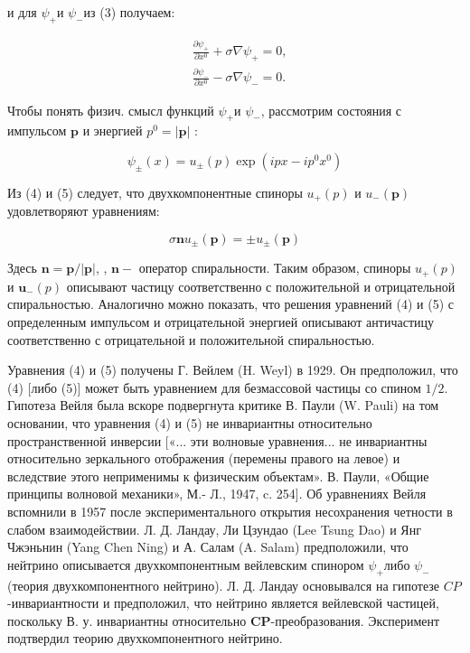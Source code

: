 \documentclass[10pt]{article}
\begin{document}
и для $\psi_{+}$и $\psi_{-}$из (3) получаем:



\[

\begin{aligned}

& \frac{\partial \psi_{+}}{\partial x^{0}}+\sigma \nabla \psi_{+}=0, \\

& \frac{\partial \psi_{-}}{\partial x^{0}}-\sigma \nabla \psi_{-}=0 .

\end{aligned}

\]



Чтобы понять физич. смысл функций $\psi_{+}$и $\psi_{-}$, рассмотрим состояния с импульсом $\boldsymbol{p}$ и энергией $p^{0}=|\boldsymbol{p}|$ :



\[

\psi_{ \pm}(x)=u_{ \pm}(p) \exp \left(i p x-i p^{0} x^{0}\right)

\]



Из (4) и (5) следует, что двухкомпонентные спиноры $u_{+}(p)$ и $u_{-}(\boldsymbol{p})$ удовлетворяют уравнениям:



\[

\sigma \boldsymbol{n} u_{ \pm}(\boldsymbol{p})= \pm u_{ \pm}(\boldsymbol{p})

\]



Здесь $\boldsymbol{n}=\boldsymbol{p} /|\boldsymbol{p}|$, , $\boldsymbol{n}-$ оператор спиральности. Таким образом, спиноры $u_{+}(p)$ и $\boldsymbol{u}_{-}(p)$ описывают частицу соответственно с положительной и отрицательной спиральностью. Аналогично можно показать, что решения уравнений (4) и (5) с определенным импульсом и отрицательной энергией описывают античастицу соответственно с отрицательной и положительной спиральностью.



Уравнения (4) и (5) получены Г. Вейлем (H. Weyl) в 1929. Он предположил, что (4) [либо (5)] может быть уравнением для безмассовой частицы со спином $1 / 2$. Гипотеза Вейля была вскоре подвергнута критике В. Паули (W. Pauli) на том основании, что уравнения (4) и (5) не инвариантны относительно пространственной инверсии [«... эти волновые уравнения... не инвариантны относительно зеркального отображения (перемены правого на левое) и вследствие этого неприменимы к физическим объектам». В. Паули, «Общие принципы волновой механики», М.- Л., 1947, c. 254]. Об уравнениях Вейля вспомнили в 1957 после экспериментального открытия несохранения четности в слабом взаимодействии. Л. Д. Ландау, Ли Цзундао (Lee Tsung Dao) и Янг Чжэньнин (Yang Chen Ning) и А. Салам (A. Salam) предположили, что нейтрино описывается двухкомпонентным вейлевским спинором $\psi_{+}$либо $\psi_{-}$(теория двухкомпонентного нейтрино). Л. Д. Ландау основывался на гипотезе $C P$-инвариантности и предположил, что нейтрино является вейлевской частицей, поскольку В. у. инвариантны относительно $\boldsymbol{C P}$-преобразования. Эксперимент подтвердил теорию двухкомпонентного нейтрино.
\end{document}
